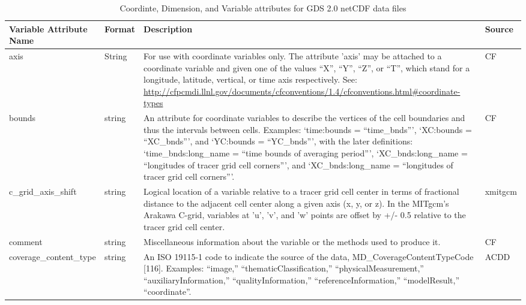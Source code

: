 \begin{longtable}{|p{}|p{}|p{}|p{}|}
\caption{Coordinte, Dimension, and Variable attributes for GDS 2.0 netCDF data files}
\label{tab:variable-attributes} \\
\hline \endfirsthead \endhead \endfoot \hline \endlastfoot
\rowcolor{blue!25} \textbf{Variable Attribute Name} & \textbf{Format} & \textbf{Description} & \textbf{Source} \\ \hline
\rowcolor{violet!25} 
axis & String & For use with coordinate variables only. The attribute 'axis' may be attached to a coordinate variable and given one of the values “X”, “Y”, “Z”, or “T”, which stand for a longitude, latitude, vertical, or time axis respectively. See: \url{http://cfpcmdi.llnl.gov/documents/cfconventions/1.4/cfconventions.html#coordinate-types} & CF \\ \hline

\rowcolor{violet!25} 
bounds & string & An attribute for coordinate variables to describe the vertices of the cell boundaries and thus the intervals between cells.  Examples: ‘time:bounds = “time\_bnds”’, ‘XC:bounds = “XC\_bnds”’, and ‘YC:bounds = “YC\_bnds”’, with the later definitions: ‘time\_bnds:long\_name = “time bounds of averaging period”’, ‘XC\_bnds:long\_name = “longitudes of tracer grid cell corners”’, and ‘XC\_bnds:long\_name = “longitudes of tracer grid cell corners”’. & CF \\ \hline

\rowcolor{violet!25} 
c\_grid\_axis\_shift & string & Logical location of a variable relative to a tracer grid cell center in terms of fractional distance to the adjacent cell center along a given axis (x, y, or z). In the MITgcm's Arakawa C-grid, variables at 'u', 'v', and 'w' points are offset by +/- 0.5 relative to the tracer grid cell center. & xmitgcm \\ \hline

\rowcolor{violet!25} 
comment & string & Miscellaneous information about the variable or the methods used to produce it. & CF \\ \hline

\rowcolor{violet!25} 
coverage\_content\_type & string & An ISO 19115-1 code to indicate the source of the data, MD\_CoverageContentTypeCode [116]. Examples: “image,” “thematicClassification,” “physicalMeasurement,” “auxiliaryInformation,” “qualityInformation,” “referenceInformation,” “modelResult,” “coordinate”. & ACDD \\ \hline


\end{longtable}
